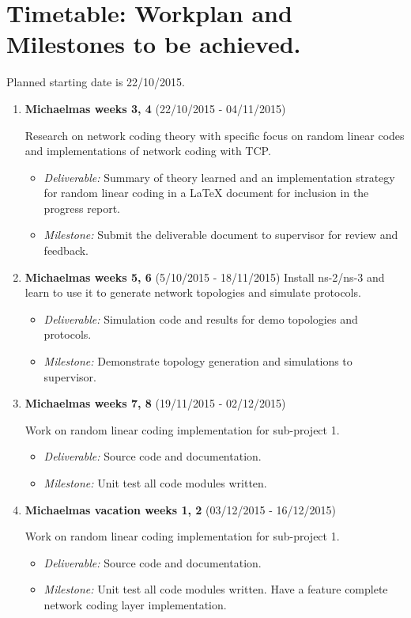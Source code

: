 \documentclass[12pt,a4paper,twoside]{article}
\begin{document}
\section*{Timetable: Workplan and Milestones to be achieved.}

Planned starting date is 22/10/2015.

\begin{enumerate}

\item {\bf Michaelmas weeks 3, 4} (22/10/2015 - 04/11/2015)

Research on network coding theory with specific focus on random linear codes and implementations of network coding with TCP.
\begin{itemize}
  \item {\em Deliverable:} Summary of theory learned and an implementation strategy for random linear coding in a LaTeX document for inclusion in the progress report. 
  \item {\em Milestone:} Submit the deliverable document to supervisor for review and feedback.
\end{itemize}

\item {\bf Michaelmas weeks 5, 6} (5/10/2015 - 18/11/2015)
Install ns-2/ns-3 and learn to use it to generate network topologies and simulate protocols.

\begin{itemize}
  \item {\em Deliverable:} Simulation code and results for demo topologies and protocols.
  \item {\em Milestone:} Demonstrate topology generation and simulations to supervisor.
\end{itemize}

\item {\bf Michaelmas weeks 7, 8} (19/11/2015 - 02/12/2015)

Work on random linear coding implementation for sub-project 1.
\begin{itemize}
  \item {\em Deliverable:} Source code and documentation.
  \item {\em Milestone:} Unit test all code modules written.
\end{itemize}

\item {\bf Michaelmas vacation weeks 1, 2} (03/12/2015 - 16/12/2015)

Work on random linear coding implementation for sub-project 1.
\begin{itemize}
  \item {\em Deliverable:} Source code and documentation.
  \item {\em Milestone:} Unit test all code modules written. Have a feature complete network coding layer implementation.
\end{itemize}


\end{enumerate}
\end{document}

